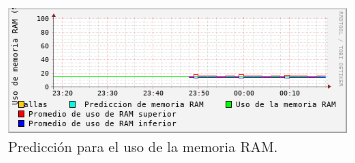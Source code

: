 \begin{figure}[htbp!]
	\centering
		\includegraphics[width=0.8\textwidth]{imagenes/HoltWinters/PrediccionRAM.png}
	\caption{Predicción para el uso de la memoria RAM.}
\end{figure}

